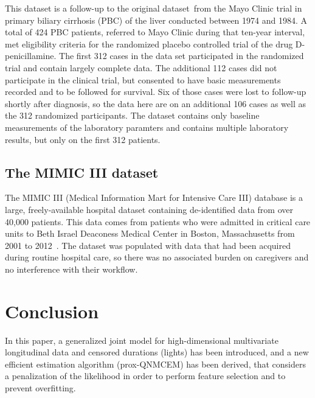 \documentclass[11pt]{article}
\begin{document}
This dataset is a follow-up to the original dataset~\citep{fleming2011counting, murtaugh1994primary}from the Mayo Clinic trial in primary biliary cirrhosis (PBC) of the liver conducted between 1974 and 1984. 
A total of 424 PBC patients, referred to Mayo Clinic during that ten-year interval, met eligibility criteria for the randomized placebo controlled trial of the drug D-penicillamine. The first 312 cases in the data set participated in the randomized trial and contain largely complete data. The additional 112 cases did not participate in the clinical trial, but consented to have basic measurements recorded and to be followed for survival. Six of those cases were lost to follow-up shortly after diagnosis, so the data here are on an additional 106 cases as well as the 312 randomized participants. 
The dataset contains only baseline measurements of the laboratory paramters and contains multiple laboratory results, but only on the first 312 patients. 


\subsection{The MIMIC III dataset}

The MIMIC III (Medical Information Mart for Intensive Care III) database is a large, freely-available hospital dataset containing de-identified data from over 40,000 patients. This data comes from patients who were admitted in critical care units to Beth Israel Deaconess Medical Center in Boston, Massachusetts from 2001 to 2012~\citep{johnson2016mimic}. The dataset was populated with data that had been acquired during routine hospital care, so there was no associated burden on caregivers and no interference with their workflow.



\section{Conclusion}
\label{sec:conclusion}

In this paper, a generalized joint model for high-dimensional multivariate longitudinal data and censored durations (lights) has been introduced, and a new efficient estimation
algorithm (prox-QNMCEM) has been derived, that considers a penalization of the likelihood in order to perform feature
selection and to prevent overfitting.
\end{document}

